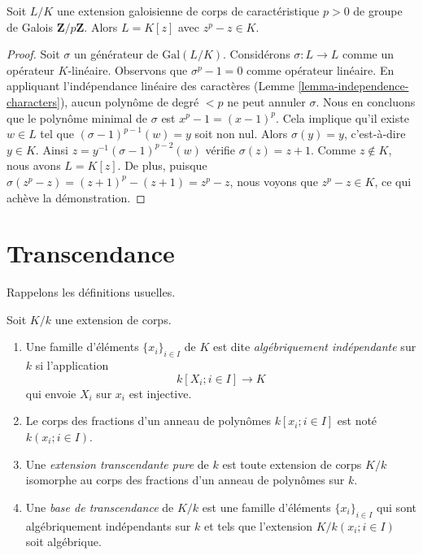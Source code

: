 \begin{lemma}
\label{lemma-Artin-Schreier}
Soit $L/K$ une extension galoisienne de corps de caractéristique $p > 0$
de groupe de Galois $\mathbf{Z}/p\mathbf{Z}$. Alors $L = K[z]$ avec
$z^p - z \in K$.
\end{lemma}

\begin{proof}
Soit $\sigma$ un générateur de $\text{Gal}(L/K)$.
Considérons $\sigma : L \to L$ comme un opérateur $K$-linéaire.
Observons que $\sigma^p - 1 = 0$ comme opérateur linéaire.
En appliquant l'indépendance linéaire des caractères
(Lemme \ref{lemma-independence-characters}),
aucun polynôme de degré $< p$ ne peut
annuler $\sigma$. Nous en concluons que le polynôme minimal
de $\sigma$ est $x^p - 1 = (x - 1)^p$.
Cela implique qu'il existe $w \in L$ tel que
$(\sigma - 1)^{p - 1}(w) = y$ soit non nul. Alors
$\sigma(y) = y$, c'est-à-dire $y \in K$. Ainsi
$z = y^{-1}(\sigma - 1)^{p - 2}(w)$ vérifie
$\sigma(z) = z + 1$. Comme $z \not \in K$, nous avons $L = K[z]$.
De plus, puisque $\sigma(z^p - z) = (z + 1)^p - (z + 1) = z^p - z$,
nous voyons que $z^p - z \in K$, ce qui achève la démonstration.
\end{proof}






\section{Transcendance}
\label{section-transcendence}

\noindent
Rappelons les définitions usuelles.

\begin{definition}
\label{definition-transcendence}
Soit $K/k$ une extension de corps.
\begin{enumerate}
\item Une famille d'éléments $\{x_i\}_{i \in I}$ de $K$ est dite
{\it algébriquement indépendante} sur $k$ si l'application
$$
k[X_i; i\in I] \longrightarrow K
$$
qui envoie $X_i$ sur $x_i$ est injective.
\item Le corps des fractions d'un anneau de polynômes
$k[x_i; i \in I]$ est noté $k(x_i; i\in I)$.
\item Une {\it extension transcendante pure} de $k$ est toute
extension de corps $K/k$ isomorphe au corps des
fractions d'un anneau de polynômes sur $k$.
\item Une {\it base de transcendance} de $K/k$ est une
famille d'éléments $\{x_i\}_{i \in I}$ qui sont
algébriquement indépendants sur $k$ et tels que
l'extension $K/k(x_i; i\in I)$ soit algébrique.
\end{enumerate}
\end{definition}

